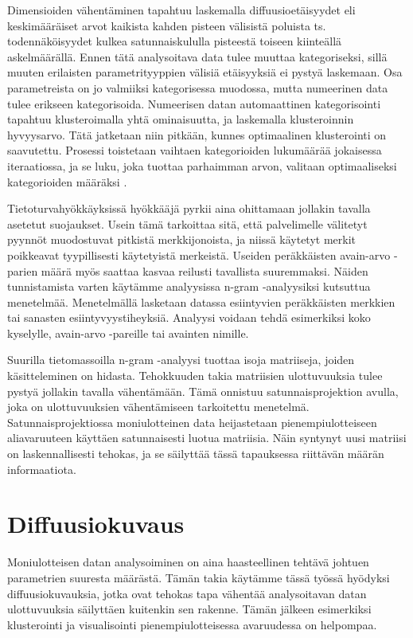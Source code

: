Dimensioiden vähentäminen tapahtuu laskemalla diffuusioetäisyydet eli keskimääräiset arvot kaikista kahden pisteen välisistä poluista ts. todennäköisyydet kulkea satunnaiskululla pisteestä toiseen kiinteällä
askelmäärällä. Ennen tätä analysoitava data tulee muuttaa kategoriseksi, sillä muuten erilaisten parametrityyppien välisiä etäisyyksiä ei pystyä laskemaan. Osa parametreista on jo valmiiksi kategorisessa 
muodossa, mutta numeerinen data tulee erikseen kategorisoida. Numeerisen datan automaattinen kategorisointi tapahtuu klusteroimalla yhtä ominaisuutta, ja laskemalla klusteroinnin hyvyysarvo. Tätä jatketaan niin pitkään,
kunnes optimaalinen klusterointi on saavutettu. Prosessi toistetaan vaihtaen kategorioiden lukumäärää jokaisessa iteraatiossa, ja se luku, joka tuottaa parhaimman arvon, valitaan optimaaliseksi kategorioiden 
määräksi .

Tietoturvahyökkäyksissä hyökkääjä pyrkii aina ohittamaan jollakin tavalla asetetut suojaukset. Usein tämä tarkoittaa sitä, että palvelimelle välitetyt pyynnöt muodostuvat pitkistä merkkijonoista, ja niissä käytetyt
merkit poikkeavat tyypillisesti käytetyistä merkeistä. Useiden peräkkäisten avain-arvo -parien määrä myös saattaa kasvaa reilusti tavallista suuremmaksi. Näiden tunnistamista varten käytämme analyysissa n-gram -analyysiksi
kutsuttua menetelmää. Menetelmällä lasketaan datassa esiintyvien peräkkäisten merkkien tai sanasten esiintyvyystiheyksiä. Analyysi voidaan tehdä esimerkiksi koko kyselylle, avain-arvo -pareille tai avainten nimille. 

Suurilla tietomassoilla n-gram -analyysi tuottaa isoja matriiseja, joiden käsitteleminen on hidasta. Tehokkuuden takia matriisien ulottuvuuksia tulee pystyä jollakin tavalla vähentämään. Tämä onnistuu satunnaisprojektion 
avulla, joka on ulottuvuuksien vähentämiseen tarkoitettu menetelmä. Satunnaisprojektiossa moniulotteinen data heijastetaan pienempiulotteiseen aliavaruuteen käyttäen satunnaisesti luotua matriisia. Näin syntynyt uusi 
matriisi on laskennallisesti tehokas, ja se säilyttää tässä tapauksessa riittävän määrän informaatiota. 

\section{Diffuusiokuvaus}

Moniulotteisen datan analysoiminen on aina haasteellinen tehtävä johtuen parametrien suuresta määrästä. Tämän takia käytämme tässä työssä hyödyksi diffuusiokuvauksia, jotka ovat tehokas tapa vähentää analysoitavan datan
ulottuvuuksia säilyttäen kuitenkin sen rakenne. Tämän jälkeen esimerkiksi klusterointi ja visualisointi pienempiulotteisessa avaruudessa on helpompaa.

